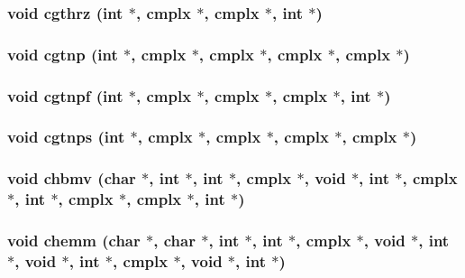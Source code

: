 \subsubsection{\setlength{\rightskip}{0pt plus 5cm}void cgthrz (int $\ast$, {\bf cmplx} $\ast$, {\bf cmplx} $\ast$, int $\ast$)}\label{essl_8h_a8d8343aed0d89d3b5e13462928cb1a8}


\subsubsection{\setlength{\rightskip}{0pt plus 5cm}void cgtnp (int $\ast$, {\bf cmplx} $\ast$, {\bf cmplx} $\ast$, {\bf cmplx} $\ast$, {\bf cmplx} $\ast$)}\label{essl_8h_23da821d0ecf67311a80428fcc264035}


\subsubsection{\setlength{\rightskip}{0pt plus 5cm}void cgtnpf (int $\ast$, {\bf cmplx} $\ast$, {\bf cmplx} $\ast$, {\bf cmplx} $\ast$, int $\ast$)}\label{essl_8h_7b891306915c4f85242b197634abb47a}


\subsubsection{\setlength{\rightskip}{0pt plus 5cm}void cgtnps (int $\ast$, {\bf cmplx} $\ast$, {\bf cmplx} $\ast$, {\bf cmplx} $\ast$, {\bf cmplx} $\ast$)}\label{essl_8h_036db28dac82c583d28b9ce9133aadbc}


\subsubsection{\setlength{\rightskip}{0pt plus 5cm}void chbmv (char $\ast$, int $\ast$, int $\ast$, {\bf cmplx} $\ast$, void $\ast$, int $\ast$, {\bf cmplx} $\ast$, int $\ast$, {\bf cmplx} $\ast$, {\bf cmplx} $\ast$, int $\ast$)}\label{essl_8h_d86ca766ecc05cca251450f2cfa5f236}


\subsubsection{\setlength{\rightskip}{0pt plus 5cm}void chemm (char $\ast$, char $\ast$, int $\ast$, int $\ast$, {\bf cmplx} $\ast$, void $\ast$, int $\ast$, void $\ast$, int $\ast$, {\bf cmplx} $\ast$, void $\ast$, int $\ast$)}\label{essl_8h_ef71ad4b7b0c1d0b375905d892877d27}



